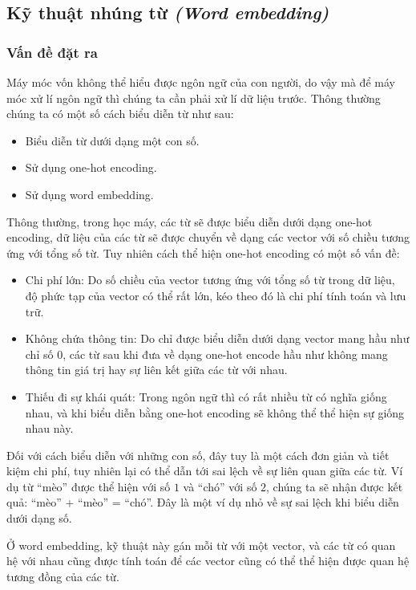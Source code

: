 \subsection{Kỹ thuật nhúng từ \textit{(Word embedding)}}
\subsubsection{Vấn đề đặt ra}
Máy móc vốn không thể hiểu được ngôn ngữ của con người, do vậy mà để máy móc xử lí ngôn ngữ thì chúng ta cần phải xử lí dữ liệu trước. Thông thường chúng ta có một số cách biểu diễn từ như sau: \cite{webpage13}
\begin{itemize}
    \item Biểu diễn từ dưới dạng một con số.
    \item Sử dụng one-hot encoding.
    \item Sử dụng word embedding.
\end{itemize}

Thông thường, trong học máy, các từ sẽ được biểu diễn dưới dạng one-hot encoding, dữ liệu của các từ sẽ được chuyển về dạng các vector với số chiều tương ứng với tổng số từ. Tuy nhiên cách thể hiện one-hot encoding có một số vấn đề: \cite{webpage12}
\begin{itemize}
    \item Chi phí lớn: Do số chiều của vector tương ứng với tổng số từ trong dữ liệu, độ phức tạp của vector có thể rất lớn, kéo theo đó là chi phí tính toán và lưu trữ.
    \item Không chứa thông tin: Do chỉ được biểu diễn dưới dạng vector mang hầu như chỉ số $0$, các từ sau khi đưa về dạng one-hot encode hầu như không mang thông tin giá trị hay sự liên kết giữa các từ với nhau.
    \item Thiếu đi sự khái quát: Trong ngôn ngữ thì có rất nhiều từ có nghĩa giống nhau, và khi biểu diễn bằng one-hot encoding sẽ không thể thể hiện sự giống nhau này.
\end{itemize}

Đối với cách biểu diễn với những con số, đây tuy là một cách đơn giản và tiết kiệm chi phí, tuy nhiên lại có thể dẫn tới sai lệch về sự liên quan giữa các từ. Ví dụ từ ``mèo'' được thể hiện với số $1$ và ``chó'' với số $2$, chúng ta sẽ nhận được kết quả: ``mèo'' + ``mèo'' = ``chó''. Đây là một ví dụ nhỏ về sự sai lệch khi biểu diễn dưới dạng số. \cite{webpage13}

Ở word embedding, kỹ thuật này gán mỗi từ với một vector, và các từ có quan hệ với nhau cũng được tính toán để các vector cũng có thể thể hiện được quan hệ tương đồng của các từ.

